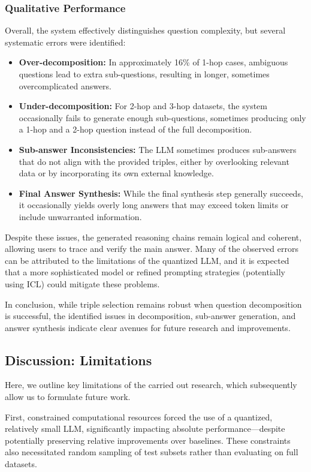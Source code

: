 \documentclass[pdflatex,sn-mathphys-num]{sn-jnl}%
\theoremstyle{thmstyleone}%
\theoremstyle{thmstyletwo}%
\theoremstyle{thmstylethree}%
\begin{document}
\subsubsection{Qualitative Performance}
Overall, the system effectively distinguishes question complexity, but several systematic errors were identified:
\begin{itemize}
    \item \textbf{Over-decomposition:} In approximately 16\% of 1-hop cases, ambiguous questions lead to extra sub-questions, resulting in longer, sometimes overcomplicated answers.
    \item \textbf{Under-decomposition:} For 2-hop and 3-hop datasets, the system occasionally fails to generate enough sub-questions, sometimes producing only a 1-hop and a 2-hop question instead of the full decomposition.
    \item \textbf{Sub-answer Inconsistencies:} The LLM sometimes produces sub-answers that do not align with the provided triples, either by overlooking relevant data or by incorporating its own external knowledge.
    \item \textbf{Final Answer Synthesis:} While the final synthesis step generally succeeds, it occasionally yields overly long answers that may exceed token limits or include unwarranted information.
\end{itemize}

Despite these issues, the generated reasoning chains remain logical and coherent, allowing users to trace and verify the main answer. Many of the observed errors can be attributed to the limitations of the quantized LLM, and it is expected that a more sophisticated model or refined prompting strategies (potentially using ICL) could mitigate these problems.

In conclusion, while triple selection remains robust when question decomposition is successful, the identified issues in decomposition, sub-answer generation, and answer synthesis indicate clear avenues for future research and improvements.


\subsection{Discussion: Limitations}
Here, we outline key limitations of the carried out research, which subsequently allow us to formulate future work.

First, constrained computational resources forced the use of a quantized, relatively small LLM, significantly impacting absolute performance—despite potentially preserving relative improvements over baselines. These constraints also necessitated random sampling of test subsets rather than evaluating on full datasets.
\end{document}
